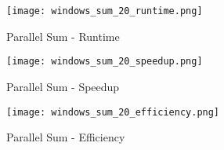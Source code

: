 \documentclass[letterpaper,12pt]{article} %
\begin{document}
\begin{figure} [H]
    \centering
          {\texttt{[image: windows\_sum\_20\_runtime.png]}}
        \caption{Parallel Sum - Runtime}
        \label{fig:sum_runtime}
    \centering
\end{figure}


\begin{figure} [H]
    \centering
          {\texttt{[image: windows\_sum\_20\_speedup.png]}}
        \caption{Parallel Sum - Speedup}
        \label{fig:sum_speedup}
    \centering
\end{figure}


\begin{figure} [H]
    \centering
          {\texttt{[image: windows\_sum\_20\_efficiency.png]}}
        \caption{Parallel Sum - Efficiency}
        \label{fig:sum_efficiency}
    \centering
\end{figure}

\clearpage


\end{document}
